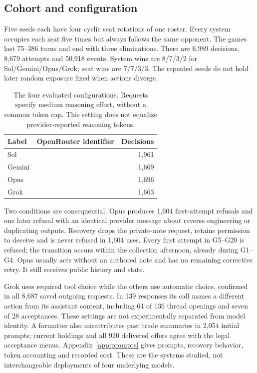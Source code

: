 \subsection{Cohort and configuration}
Five seeds each have four cyclic seat rotations of one roster. Every system occupies each seat five times but always follows the same opponent. The games last 75--386 turns and end with three eliminations. There are 6,989 decisions, 8,679 attempts and 50,918 events. System wins are 8/7/3/2 for Sol/Gemini/Opus/Grok; seat wins are 7/7/3/3. The repeated seeds do not hold later random exposure fixed when actions diverge.

\begin{table}[t]\centering\small
\begin{tabularx}{\linewidth}{@{}lYr@{}}\toprule
Label & OpenRouter identifier & Decisions\\\midrule
Sol & &1,961\\
Gemini & &1,669\\
Opus & &1,696\\
Grok & &1,663\\\bottomrule
\end{tabularx}
\caption{The four evaluated configurations. Requests specify medium reasoning effort, without a common token cap. This setting does not equalize provider-reported reasoning tokens.}
\end{table}

Two conditions are consequential. Opus produces 1,604 first-attempt refusals and one later refusal with an identical provider message about reverse engineering or duplicating outputs. Recovery drops the private-note request, retains permission to deceive and is never refused in 1,604 uses. Every first attempt in G5--G20 is refused; the transition occurs within the collection afternoon, already during G1--G4. Opus usually acts without an authored note and has no remaining corrective retry. It still receives public history and state.

Grok uses required tool choice while the others use automatic choice, confirmed in all 8,687 saved outgoing requests. In 139 responses its call names a different action from its assistant content, including 64 of 136 thread openings and seven of 28 acceptances. These settings are not experimentally separated from model identity. A formatter also misattributes past trade summaries in 2,054 initial prompts; current holdings and all 920 delivered offers agree with the legal acceptance menus. Appendix~\ref{app:prompts} gives prompts, recovery behavior, token accounting and recorded cost. These are the systems studied, not interchangeable deployments of four underlying models.


